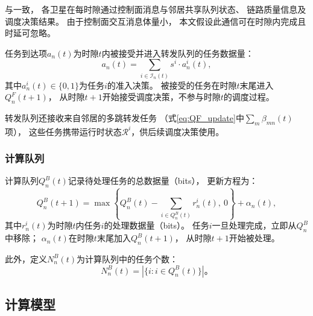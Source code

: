 \documentclass[a4paper,11pt]{article}
\begin{document}
与\cite{zhang2024mhspo}一致，
各卫星在每时隙通过控制面消息与邻居共享队列状态、
链路质量信息及调度决策结果。
由于控制面交互消息体量小，
本文假设此通信可在时隙内完成且时延可忽略。

任务到达项$a_n(t)$为时隙$t$内被接受并进入转发队列的任务数据量：
\begin{equation}
    a_n(t) = \sum_{i \in \mathcal{I}_n(t)} s^i \cdot a^i_n(t),
    \label{eq:arrival}
\end{equation}
其中$a^i_n(t) \in \{0,1\}$为任务$i$的准入决策。
被接受的任务在时隙$t$末尾进入$Q^F_n(t+1)$，
从时隙$t+1$开始接受调度决策，不参与时隙$t$的调度过程。

转发队列还接收来自邻居的多跳转发任务
（式\eqref{eq:QF_update}中$\sum_{m}\beta_{mn}(t)$项），
这些任务携带运行时状态$\mathcal{R}^i$，供后续调度决策使用。

\subsubsection{计算队列}

计算队列$Q^B_n(t)$记录待处理任务的总数据量（bits），
更新方程为\cite{zhang2024mhspo}：
\begin{equation}
    Q^B_n(t\!+\!1) = \max\!\left\{Q^B_n(t)
    - \sum_{i \in Q^B_n(t)} r^i_n(t),~0\right\}
    + \alpha_n(t),
    \label{eq:QB_update}
\end{equation}
其中$r^i_n(t)$为时隙$t$内任务$i$的处理数据量（bits）。
任务$i$一旦处理完成，立即从$Q^B_n$中移除；
$\alpha_n(t)$在时隙$t$末尾加入$Q^B_n(t+1)$，
从时隙$t+1$开始被处理。

此外，定义$N^B_n(t)$为计算队列中的任务个数：
\begin{equation}
    N^B_n(t) = |\{i : i \in Q^B_n(t)\}|。
\end{equation}

\subsection{计算模型}
\end{document}
